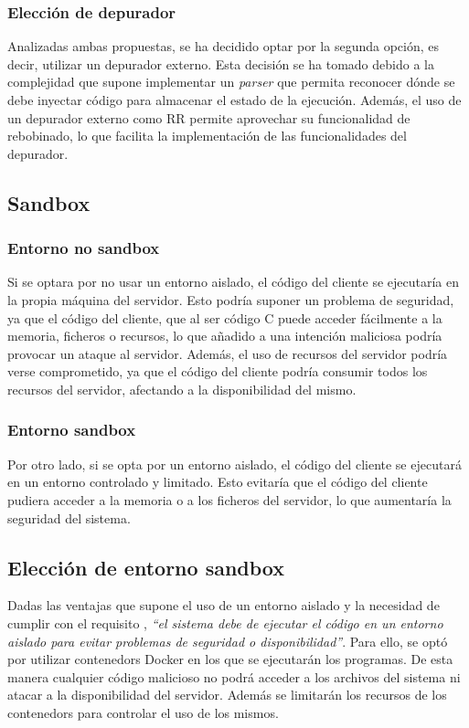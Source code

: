 \subsubsection{Elección de depurador} \label{subsec:eleccion-depurador}

Analizadas ambas propuestas, se ha decidido optar por la segunda opción, es decir, utilizar un \gls{depurador} externo. Esta decisión se ha tomado debido a la complejidad que supone implementar un \textit{\gls{parser}} que permita reconocer dónde se debe inyectar código para almacenar el estado de la ejecución. Además, el uso de un \gls{depurador} externo como RR permite aprovechar su funcionalidad de rebobinado, lo que facilita la implementación de las funcionalidades del depurador.

\subsection{Sandbox} \label{subsec:sandbox}

\subsubsection{Entorno no sandbox} \label{subsubsec:entorno-no-sandbox}
Si se optara por no usar un entorno aislado, el código del cliente se ejecutaría en la propia máquina del servidor. Esto podría suponer un problema de seguridad, ya que el código del cliente, que al ser código C puede acceder fácilmente a la memoria, ficheros o recursos, lo que añadido a una intención maliciosa podría provocar un ataque al servidor. Además, el uso de recursos del servidor podría verse comprometido, ya que el código del cliente podría consumir todos los recursos del servidor, afectando a la disponibilidad del mismo.

\subsubsection{Entorno sandbox} \label{subsubsec:entorno-sandbox}
Por otro lado, si se opta por un entorno aislado, el código del cliente se ejecutará en un entorno controlado y limitado. Esto evitaría que el código del cliente pudiera acceder a la memoria o a los ficheros del servidor, lo que aumentaría la seguridad del sistema. 

\subsection{Elección de entorno sandbox} \label{subsec:eleccion-sandbox}
Dadas las ventajas que supone el uso de un entorno aislado y la necesidad de cumplir con  el requisito , \textit{“el sistema debe de ejecutar el código en un entorno aislado para evitar problemas de seguridad o disponibilidad”}. Para ello, se optó por utilizar \glspl{contenedor} Docker en los que se ejecutarán los programas. De esta manera cualquier código malicioso no podrá acceder a los archivos del sistema ni atacar a la disponibilidad del servidor. Además se limitarán los recursos de los \glspl{contenedor} para controlar el uso de los mismos.

